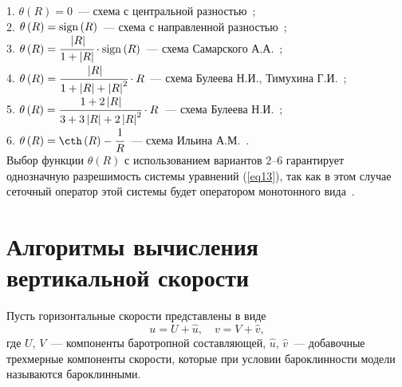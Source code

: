\documentclass[press]{vestnik}
\begin{document}
1. $\theta \left( R \right)=0$~--- схема с центральной разностью~\cite{B13};\\[0mm]

2. $\theta \left( R \right)=\mathop{\mathrm{sign}}\nolimits\left( R \right)$~--- схема с направленной 
разностью~\cite{B13};\\[0mm]

3. $\theta \left( R \right)=\cfrac{\left| R \right|}{1+\left| R \right|}\cdot 
\mathop{\mathrm{sign}}\nolimits\left( R \right)$~--- схема Самарского А.А.~\cite{B14};\\[1mm]

4. $\theta \left( R \right)=\cfrac{\left| R \right|}{1+\left| R \right|+\left| R \right|^{2}}\cdot R$~--- схема Булеева Н.И., Тимухина Г.И.~\cite{B15}; \\[1mm]

5. $\theta \left( R \right)=\cfrac{1+2\left| R \right|}{3+3\left| R \right|+2\left| R \right|^{2}}\cdot R$~--- схема Булеева Н.И.~\cite{B16}; \\[1mm]

6. $\theta \left( R \right)=\cth\left( R \right)-\cfrac{1}{R}$~--- схема Ильина 
А.М.~\cite{B17,B18}.\\[1mm]

Выбор функции $\theta \left( R \right)$ с использованием вариантов 2--6 
гарантирует однозначную разрешимость системы уравнений (\ref{eq13}), так как в этом 
случае сеточный оператор этой системы будет оператором монотонного вида~\cite{B19}.

\section{Алгоритмы вычисления вертикальной скорости}

Пусть горизонтальные скорости представлены в виде
\begin{equation}
\label{eq16}
u=U+\hat{{u}},\quad v=V+\hat{{v}},
\end{equation}
где $U$, $V$~--- компоненты баротропной составляющей, $\hat{{u}}$, $\hat{{v}}$~--- добавочные трехмерные компоненты скорости, которые при условии 
бароклинности модели называются бароклинными. 
\end{document}
